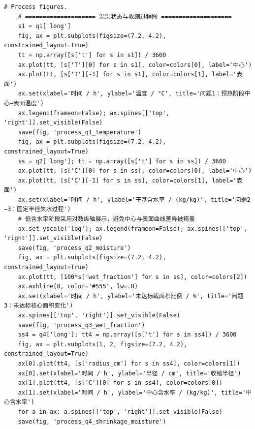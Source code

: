 \begin{Verbatim}[fontsize=\scriptsize,breaklines=true,breakanywhere=true]
    # Process figures.
    # ==================== 温湿状态与收缩过程图 ====================
    s1 = q1['long']
    fig, ax = plt.subplots(figsize=(7.2, 4.2), constrained_layout=True)
    tt = np.array([s['t'] for s in s1]) / 3600
    ax.plot(tt, [s['T'][0] for s in s1], color=colors[0], label='中心')
    ax.plot(tt, [s['T'][-1] for s in s1], color=colors[1], label='表面')
    ax.set(xlabel='时间 / h', ylabel='温度 / °C', title='问题1：预热阶段中心—表面温度')
    ax.legend(frameon=False); ax.spines[['top', 'right']].set_visible(False)
    save(fig, 'process_q1_temperature')
    fig, ax = plt.subplots(figsize=(7.2, 4.2), constrained_layout=True)
    ss = q2['long']; tt = np.array([s['t'] for s in ss]) / 3600
    ax.plot(tt, [s['C'][0] for s in ss], color=colors[0], label='中心')
    ax.plot(tt, [s['C'][-1] for s in ss], color=colors[1], label='表面')
    ax.set(xlabel='时间 / h', ylabel='干基含水率 / (kg/kg)', title='问题2—3：固定半径失水过程')
    # 低含水率阶段采用对数纵轴展示，避免中心与表面曲线差异被掩盖
    ax.set_yscale('log'); ax.legend(frameon=False); ax.spines[['top', 'right']].set_visible(False)
    save(fig, 'process_q2_moisture')
    fig, ax = plt.subplots(figsize=(7.2, 4.2), constrained_layout=True)
    ax.plot(tt, [100*s['wet_fraction'] for s in ss], color=colors[2])
    ax.axhline(0, color='#555', lw=.8)
    ax.set(xlabel='时间 / h', ylabel='未达标截面积比例 / %', title='问题3：未达标核心面积变化')
    ax.spines[['top', 'right']].set_visible(False)
    save(fig, 'process_q3_wet_fraction')
    ss4 = q4['long']; tt4 = np.array([s['t'] for s in ss4]) / 3600
    fig, ax = plt.subplots(1, 2, figsize=(7.2, 4.2), constrained_layout=True)
    ax[0].plot(tt4, [s['radius_cm'] for s in ss4], color=colors[1])
    ax[0].set(xlabel='时间 / h', ylabel='半径 / cm', title='收缩半径')
    ax[1].plot(tt4, [s['C'][0] for s in ss4], color=colors[0])
    ax[1].set(xlabel='时间 / h', ylabel='中心含水率 / (kg/kg)', title='中心含水率')
    for a in ax: a.spines[['top', 'right']].set_visible(False)
    save(fig, 'process_q4_shrinkage_moisture')


\end{Verbatim}
